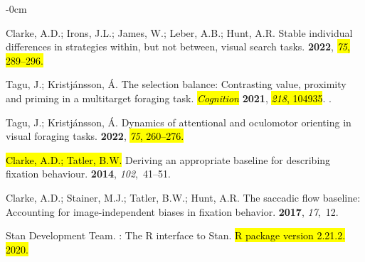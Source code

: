 \documentclass[vision,article,accept,pdftex,moreauthors]{Definitions/mdpi}
\begin{document}
\begin{adjustwidth}{-\extralength}{0cm}
\begin{thebibliography}{999}
Clarke, A.D.; Irons, J.L.; James, W.; Leber, A.B.; Hunt, A.R.
\newblock Stable individual differences in strategies within, but not between,
  visual search tasks.
 {\bf 2022}, \hl{\emph{75},  289--296.}

Tagu, J.; Kristj{\'a}nsson, {\'A}.
\newblock The selection balance: Contrasting value, proximity and priming in a
  multitarget foraging task. \emph{\hl{Cognition}}  \textbf{2021}, \hl{\emph{218}, 104935}.
.


Tagu, J.; Kristj{\'a}nsson, {\'A}.
\newblock Dynamics of attentional and oculomotor orienting in visual foraging
  tasks.
 {\bf 2022}, \hl{\emph{75}, 260--276.}


\hl{Clarke, A.D.; Tatler, B.W.} %
\newblock Deriving an appropriate baseline for describing fixation behaviour.
 {\bf 2014}, {\em 102},~41--51.

Clarke, A.D.; Stainer, M.J.; Tatler, B.W.; Hunt, A.R.
\newblock The saccadic flow baseline: Accounting for image-independent biases
  in fixation behavior.
 {\bf 2017}, {\em 17},~12.

{Stan Development Team}.
: The {R} interface to {Stan}. 
\newblock \hl{R package version 2.21.2. 2020. } %


\end{thebibliography}
\end{adjustwidth}
\end{document}
